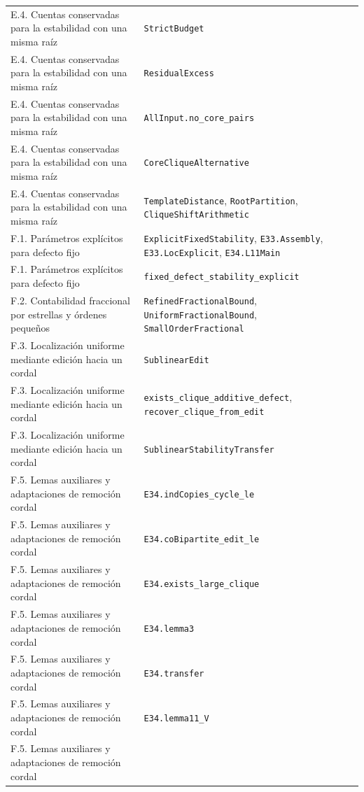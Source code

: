 \documentclass[spanish,11pt,a4paper]{article}
\begin{document}
{\begin{longtable}[]{@{}
  >{\raggedright\arraybackslash}p{}
  >{\raggedright\arraybackslash}p{}@{}}
E.4. Cuentas conservadas para la estabilidad con una misma raíz &
\nolinkurl{StrictBudget} \\
E.4. Cuentas conservadas para la estabilidad con una misma raíz &
\nolinkurl{ResidualExcess} \\
E.4. Cuentas conservadas para la estabilidad con una misma raíz &
\nolinkurl{AllInput.no_core_pairs} \\
E.4. Cuentas conservadas para la estabilidad con una misma raíz &
\nolinkurl{CoreCliqueAlternative} \\
E.4. Cuentas conservadas para la estabilidad con una misma raíz &
\nolinkurl{TemplateDistance}, \nolinkurl{RootPartition},
\nolinkurl{CliqueShiftArithmetic} \\
F.1. Parámetros explícitos para defecto fijo &
\nolinkurl{ExplicitFixedStability}, \nolinkurl{E33.Assembly},
\nolinkurl{E33.LocExplicit}, \nolinkurl{E34.L11Main} \\
F.1. Parámetros explícitos para defecto fijo &
\nolinkurl{fixed_defect_stability_explicit} \\
F.2. Contabilidad fraccional por estrellas y órdenes pequeños &
\nolinkurl{RefinedFractionalBound}, \nolinkurl{UniformFractionalBound},
\nolinkurl{SmallOrderFractional} \\
F.3. Localización uniforme mediante edición hacia un cordal &
\nolinkurl{SublinearEdit} \\
F.3. Localización uniforme mediante edición hacia un cordal &
\nolinkurl{exists_clique_additive_defect},
\nolinkurl{recover_clique_from_edit} \\
F.3. Localización uniforme mediante edición hacia un cordal &
\nolinkurl{SublinearStabilityTransfer} \\
F.5. Lemas auxiliares y adaptaciones de remoción cordal &
\nolinkurl{E34.indCopies_cycle_le} \\
F.5. Lemas auxiliares y adaptaciones de remoción cordal &
\nolinkurl{E34.coBipartite_edit_le} \\
F.5. Lemas auxiliares y adaptaciones de remoción cordal &
\nolinkurl{E34.exists_large_clique} \\
F.5. Lemas auxiliares y adaptaciones de remoción cordal &
\nolinkurl{E34.lemma3} \\
F.5. Lemas auxiliares y adaptaciones de remoción cordal &
\nolinkurl{E34.transfer} \\
F.5. Lemas auxiliares y adaptaciones de remoción cordal &
\nolinkurl{E34.lemma11_V} \\
F.5. Lemas auxiliares y adaptaciones de remoción cordal &

\end{longtable}}
\end{document}
